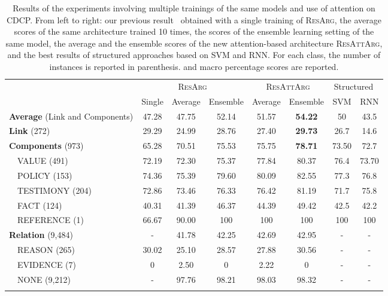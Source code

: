 \documentclass[journal]{IEEEtran}
\begin{document}
\begin{table*}[t]
\centering
 \caption[Results of the experiments involving multiple trainings of the same models and use of attention on CDCP.]{Results of the experiments involving multiple trainings of the same models and use of attention on CDCP. From left to right: our previous result~\cite{W18-5201} obtained with a single training of \textsc{ResArg}, the average scores of the same architecture trained 10 times, the scores of the ensemble learning setting of the same model, the average and the ensemble scores of the new attention-based architecture \textsc{ResAttArg}, and the best results of structured approaches based on SVM and RNN. For each class, the number of instances is reported in parenthesis.
  and macro  percentage scores are reported.}
 \label{table:resnets_results2}
 \begin{tabular}{l ccc cc cc}
 \noalign{\smallskip}
 \hline
 \noalign{\smallskip}
 & \multicolumn{3}{c}{\textsc{ResArg}} & \multicolumn{2}{c}{\textsc{ResAttArg}}  & \multicolumn{2}{c}{Structured~\cite{DBLP:conf/acl/NiculaePC17}} \\
	&	Single\cite{W18-5201}    &   Average	&	Ensemble	&   Average &	Ensemble	&	SVM	&	RNN	\\
 \noalign{\smallskip}
 \hline
 \noalign{\smallskip}	

\textbf{Average} (Link and Components)	&	 47.28   &   47.75	&	52.14	&   51.57  &	\textbf{54.22}	&	50	&	43.5	\\
\noalign{\smallskip}											
\textbf{Link} (272)	&	29.29   &   24.99	&	28.76	&	27.40   &   \textbf{29.73}	&	26.7	&	14.6	\\

\noalign{\smallskip}											
\textbf{Components} (973)   &	65.28   &	70.51	&	75.53	&	75.75   &   \textbf{78.71}	&	73.50	&	72.7	\\
~~VALUE (491)	&   72.19   &   72.30	&	75.37	&   77.84   &	80.37	&	76.4	&	73.70	\\
~~POLICY (153)	&	74.36   &   75.39	&	79.60	&	80.09   &   82.55	&	77.3	&	76.8	\\
~~TESTIMONY (204)   &	72.86   &	73.46	&	76.33	&	76.42    &   81.19	&	71.7	&	75.8	\\
~~FACT (124)	&	40.31   &   41.39	&	46.37	&   44.39    &   49.42	&	42.5	&	42.2	\\
~~REFERENCE (1)	&	66.67   &   90.00	&	100	&	100	&	100 &   100	&	100	\\
\noalign{\smallskip}											
\textbf{Relation} (9,484)    & - & 41.78  & 42.25  &   42.69  &   42.95    & -  & -  \\
~~REASON (265)	&   30.02   &	25.10	&	28.57	&	27.88   &   30.56	&	-	&	-	\\
~~EVIDENCE (7)	&   0   &	2.50	&	0	&	2.22  &   0	&	-	& -		\\
~~NONE (9,212)	& -  &	97.76 & 98.21	&	98.03   & 98.32	& - & -		\\


\noalign{\smallskip}
 \hline
 \end{tabular}
\end{table*}
\end{document}
